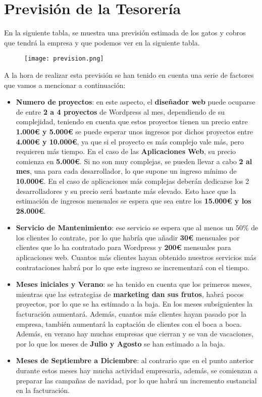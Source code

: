 \section{Previsión de la Tesorería}
En la siguiente tabla, se muestra una previsión estimada de los gatos y cobros que tendrá la empresa y que podemos ver en la siguiente tabla.

\begin{figure}[H]
    \centering
    \texttt{[image: prevision.png]}
\end{figure}

A la hora de realizar esta previsión se han tenido en cuenta una serie de factores que vamos a mencionar a continuación:

\begin{itemize}
    \item \textbf{Numero de proyectos}: en este aspecto, el \textbf{diseñador web} puede ocuparse de entre \textbf{2 a 4 proyectos} de Wordpress al mes, dependiendo de su complejidad, teniendo en cuenta que estos proyectos tienen un precio entre \textbf{1.000€ y 5.000€} se puede esperar unos ingresos por dichos proyectos entre \textbf{4.000€ y 10.000€}, ya que si el proyecto es más complejo vale más, pero requieren más tiempo. En el caso de las \textbf{Aplicaciones Web}, su precio comienza en \textbf{5.000€}. Si no son muy complejas, se pueden llevar a cabo \textbf{2 al mes}, una para cada desarrollador, lo que supone un ingreso mínimo de \textbf{10.000€}. En el caso de aplicaciones más complejas deberán dedicarse los 2 desarrolladores y su precio será bastante más elevado. Esto hace que la estimación de ingresos mensuales se
    espera que sea entre los \textbf{15.000€ y los 28.000€}.

    \item \textbf{Servicio de Mantenimiento}: ese servicio se espera que al menos un 50\% de los clientes lo
    contrate, por lo que habría que añadir \textbf{30€} mensuales por clientes que lo ha contratado para Wordpress y \textbf{200€} mensuales para aplicaciones web. Cuantos más clientes hayan obtenido nuestros servicios más contrataciones habrá por lo que este ingreso se incrementará con el tiempo.

    \item \textbf{Meses iniciales y Verano}: se ha tenido en cuenta que los primeros meses, mientras que las estrategias de \textbf{marketing dan sus frutos}, habrá pocos proyectos, por lo que se ha estimado a la baja. En los meses subsiguientes la facturación aumentará. Además, cuantos más clientes hayan pasado por la empresa, también aumentará la captación de clientes con el boca a boca.  Además, en verano hay muchas empresas que cierran y se van de vacaciones, por lo que los meses de \textbf{Julio y Agosto} se han estimado a la baja.

    \item \textbf{Meses de Septiembre a Diciembre}: al contrario que en el punto anterior durante estos meses hay mucha actividad empresaria, además, se comienzan a preparar las campañas de navidad, por lo que habrá un incremento sustancial en la facturación.
\end{itemize}

